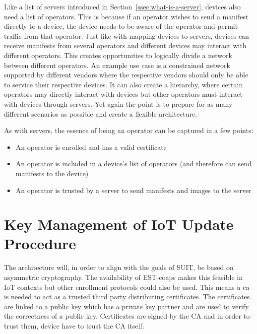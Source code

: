 \documentclass[0-thesis.tex]{subfiles}
\begin{document}
Like a list of servers introduced in Section~\ref{ssec:what-is-a-server}, devices also
need a list of operators. This is because if an operator wishes to send a manifest
directly to a device, the device needs to be aware of the operator and permit traffic from
that operator. Just like with mapping devices to servers, devices can receive manifests
from several operators and different devices may interact with different operators. This
creates opportunities to logically divide a network between different operators. An
example use case is a constrained network supported by different vendors where the
respective vendors should only be able to service their respective devices. It can also
create a hierarchy, where certain operators may directly interact with devices but other
operators must interact with devices through servers. Yet again the point is to prepare
for as many different scenarios as possible and create a flexible architecture.

As with servers, the essence of being an operator can be captured in a few points:

\begin{itemize}
    \item An operator is enrolled and has a valid certificate
    \item An operator is included in a device's list of operators (and therefore can send
            manifests to the device)
    \item An operator is trusted by a server to send manifests and images to the server
\end{itemize}

\section{Key Management of IoT Update Procedure}
\label{sec:key-management}
The architecture will, in order to align with the goals of SUIT, be based on asymmetric
cryptography. The availability of EST-coaps makes this feasible in IoT contexts but other
enrollment protocols could also be used. This means a \gls{ca} is needed to act as a
trusted third party distributing certificates. The certificates are linked to a public key
which has a private key partner and are used to verify the correctness of a public key.
Certificates are signed by the CA and in order to trust them, device have to trust the CA
itself.
\end{document}
